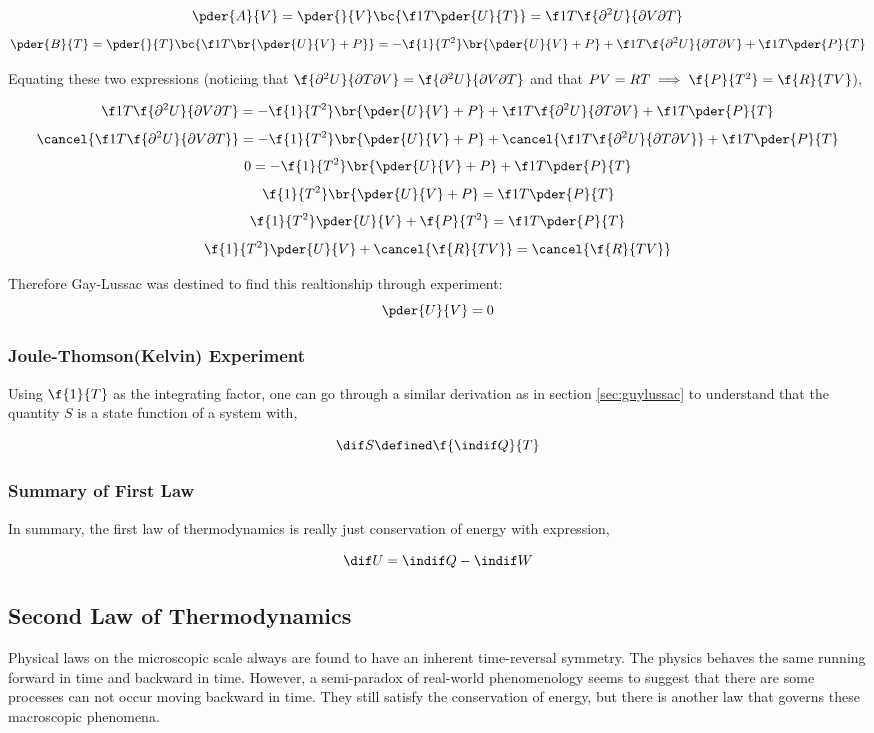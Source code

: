 \documentclass{article}
\begin{document}
\[ \pder{A}{V} = \pder{}{V}\bc{\f1T \pder{U}{T}} = \f1T \f{\partial^2 U}{\partial V \partial T} \]
\[ \pder{B}{T} = \pder{}{T}\bc{\f1T \br{\pder{U}{V} + P}} = -\f{1}{T^2} \br{\pder{U}{V} + P} + \f1T \f{\partial^2 U}{\partial T \partial V} + \f1T \pder{P}{T} \]

Equating these two expressions (noticing that $\f{\partial^2 U}{\partial T \partial V} = \f{\partial^2 U}{\partial V \partial T}$ and that $PV = RT \implies \f{P}{T^2} = \f{R}{TV}$),

\[ \f1T \f{\partial^2 U}{\partial V \partial T} = -\f{1}{T^2} \br{\pder{U}{V} + P} + \f1T \f{\partial^2 U}{\partial T \partial V} + \f1T \pder{P}{T} \]
\[ \cancel{\f1T \f{\partial^2 U}{\partial V \partial T}} = -\f{1}{T^2} \br{\pder{U}{V} + P} + \cancel{\f1T \f{\partial^2 U}{\partial T \partial V}} + \f1T \pder{P}{T} \]
\[ 0 = -\f{1}{T^2} \br{\pder{U}{V} + P} + \f1T \pder{P}{T} \]
\[ \f{1}{T^2} \br{\pder{U}{V} + P} = \f1T \pder{P}{T} \]
\[ \f{1}{T^2} \pder{U}{V} + \f{P}{T^2} = \f1T \pder{P}{T} \]
\[ \f{1}{T^2} \pder{U}{V} + \cancel{\f{R}{TV}} = \cancel{\f{R}{TV}} \]

Therefore Gay-Lussac was destined to find this realtionship through experiment:
\[ \pder{U}{V} = 0 \]

\subsubsection{Joule-Thomson(Kelvin) Experiment}

Using $\f{1}{T}$ as the integrating factor, one can go through a similar derivation as in section \ref{sec:guylussac} to understand that the quantity $S$ is a state function of a system with,

\[ \dif S \defined \f{\indif Q}{T}  \]

\subsubsection{Summary of First Law}

In summary, the first law of thermodynamics is really just conservation of energy with expression,

\[ \dif U = \indif Q - \indif W \]

\subsection{Second Law of Thermodynamics}

Physical laws on the microscopic scale always are found to have an inherent time-reversal symmetry. The physics behaves the same running forward in time and backward in time. However, a semi-paradox of real-world phenomenology seems to suggest that there are some processes can not occur moving backward in time. They still satisfy the conservation of energy, but there is another law that governs these macroscopic phenomena.
\end{document}

